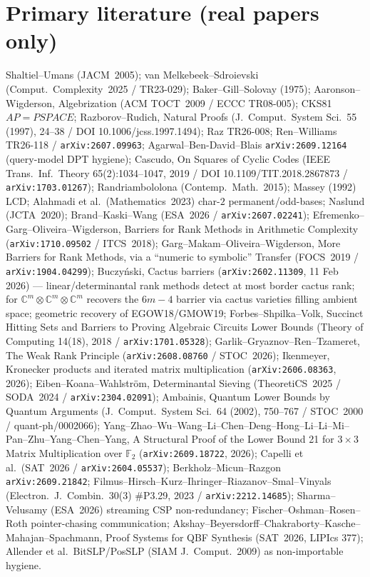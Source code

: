 \documentclass[11pt]{article}
\begin{document}
\section*{Primary literature (real papers only)}
Shaltiel--Umans (JACM~2005); van Melkebeek--Sdroievski (Comput.\ Complexity~2025 /
TR23-029); Baker--Gill--Solovay (1975); Aaronson--Wigderson, Algebrization
(ACM TOCT~2009 / ECCC TR08-005); CKS81 $AP=PSPACE$; Razborov--Rudich, Natural
Proofs (J.\ Comput.\ System Sci.\ 55 (1997), 24--38 / DOI 10.1006/jcss.1997.1494);
Raz TR26-008; Ren--Williams TR26-118 / \texttt{arXiv:2607.09963};
Agarwal--Ben-David--Blais \texttt{arXiv:2609.12164} (query-model DPT hygiene);
Cascudo, On Squares of Cyclic Codes (IEEE Trans.\ Inf.\ Theory 65(2):1034--1047,
2019 / DOI 10.1109/TIT.2018.2867873 / \texttt{arXiv:1703.01267});
Randriambololona (Contemp.\ Math.\ 2015); Massey (1992) LCD;
Alahmadi et al.\ (Mathematics~2023) char-$2$ permanent/odd-bases;
Naslund (JCTA~2020); Brand--Kaski--Wang (ESA~2026 / \texttt{arXiv:2607.02241});
Efremenko--Garg--Oliveira--Wigderson, Barriers for Rank Methods in Arithmetic
Complexity (\texttt{arXiv:1710.09502} / ITCS~2018);
Garg--Makam--Oliveira--Wigderson, More Barriers for Rank Methods, via a
``numeric to symbolic'' Transfer (FOCS~2019 / \texttt{arXiv:1904.04299});
Buczy\'nski, Cactus barriers (\texttt{arXiv:2602.11309}, 11 Feb 2026) ---
linear/determinantal rank methods detect at most border cactus rank; for
$\mathbb C^m\otimes\mathbb C^m\otimes\mathbb C^m$ recovers the $6m-4$ barrier
via cactus varieties filling ambient space; geometric recovery of EGOW18/GMOW19;
Forbes--Shpilka--Volk, Succinct Hitting Sets and Barriers to Proving Algebraic
Circuits Lower Bounds (Theory of Computing 14(18), 2018 /
\texttt{arXiv:1701.05328});
Garlik--Gryaznov--Ren--Tzameret, The Weak Rank Principle
(\texttt{arXiv:2608.08760} / STOC~2026);
Ikenmeyer, Kronecker products and iterated matrix multiplication
(\texttt{arXiv:2606.08363}, 2026);
Eiben--Koana--Wahlstr\"om, Determinantal Sieving (TheoretiCS~2025 / SODA~2024 /
\texttt{arXiv:2304.02091});
Ambainis, Quantum Lower Bounds by Quantum Arguments (J.\ Comput.\ System Sci.\ 64
(2002), 750--767 / STOC~2000 / quant-ph/0002066);
Yang--Zhao--Wu--Wang--Li--Chen--Deng--Hong--Li--Li--Mi--Pan--Zhu--Yang--Chen--Yang,
A Structural Proof of the Lower Bound 21 for $3\times 3$ Matrix Multiplication
over $\mathbb F_2$ (\texttt{arXiv:2609.18722}, 2026);
Capelli et al.\ (SAT~2026 / \texttt{arXiv:2604.05537}); Berkholz--Micun--Razgon
\texttt{arXiv:2609.21842}; Filmus--Hirsch--Kurz--Ihringer--Riazanov--Smal--Vinyals
(Electron.\ J.\ Combin.\ 30(3) \#P3.29, 2023 / \texttt{arXiv:2212.14685});
Sharma--Velusamy (ESA~2026) streaming CSP non-redundancy;
Fischer--Oshman--Rosen--Roth pointer-chasing communication;
Akshay--Beyersdorff--Chakraborty--Kasche--Mahajan--Spachmann, Proof Systems for
QBF Synthesis (SAT~2026, LIPIcs 377);
Allender et al.\ BitSLP/PosSLP (SIAM J.\ Comput.\ 2009) as non-importable hygiene.
\end{document}
